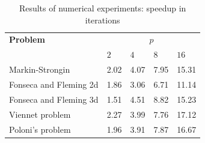 \documentclass{llncs}
\begin{document}
\begin{table}
  \centering
  \caption{Results of numerical experiments: speedup in iterations}
  \label{tab:exResultsItersSpeedup}
  \begin{tabular}{|l|K{1.5cm}|K{1.5cm}|K{1.5cm}|K{1.5cm}|}
\hline
\textbf{Problem} & \\
  & \(2\) & \(4\) & \(8\) & \(16\)\\
\hline
Markin-Strongin & 2.02 & 4.07 & 7.95 & 15.31 \\
\hline
Fonseca and Fleming 2d & 1.86 & 3.06 & 6.71 & 11.14 \\
\hline
Fonseca and Fleming 3d & 1.51 & 4.51 & 8.82 & 15.23 \\
\hline
Viennet problem & 2.27 & 3.99 & 7.76 & 17.12\\
\hline
Poloni's problem & 1.96 & 3.91 & 7.87 & 16.67 \\
\hline
\end{tabular}
\end{table}
\end{document}

